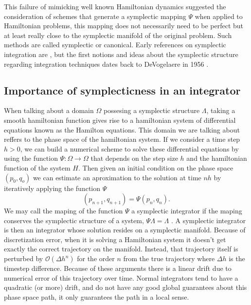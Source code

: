 This failure of mimicking well known Hamiltonian dynamics suggested the consideration of schemes that generate a symplectic mapping $\Psi$ when applied to Hamiltonian problems, this mapping does not necessarily need to be perfect but at least really close to the symplectic manifold of the original problem. Such methods are called symplectic or canonical. Early references on symplectic integration are \cite{ruth1983canonical}\cite{channell1983symplectic}\cite{menyuk1984some}\cite{feng2010symplectic}\cite{kang1991symplectic}, but the first notions and ideas about the symplectic structure regarding integration techniques dates back to DeVogelaere in 1956 \cite{channell1990symplectic}.



\subsection{Importance of symplecticness in an integrator}
When talking about a domain $\Omega$ possesing a symplectic structure $\Lambda$, taking a smooth hamiltonian function gives rise to a hamiltonian system of differential equations known as the Hamilton equations. This domain we are talking about reffers to the phase space of the hamiltonian system. If we consider a time step $h>0$, we can build a numerical scheme to solve these differential equations by using the function $\Psi :\Omega \rightarrow \Omega$ that depends on the step size $h$ and the hamiltonian function of the system $H$. Then given an initial condition on the phase space $(p_0,q_o)$ we can estimate an aproximation to the solution at time $nh$ by iteratively applying the function $\Psi$
\begin{equation}
(p_{n+1},q_{n+1})=\Psi(p_{n},q_{n}).
\end{equation}
We may call the maping of the function $\Psi$ a symplectic integrator if the maping conserves the symplectic structure of a system, $\Psi \Lambda=\Lambda$\cite{markiewicz1999survey}\cite{de1956methods}\cite{ruth1983canonical} \cite{channell1983symplectic}.
A symplectic integrator is then an integrator whose solution resides on a symplectic manifold. Because of discretization error, when it is solving a Hamiltonian system it doesn't get exactly the correct trajectory on the manifold. Instead, that trajectory itself is perturbed by $\mathcal{O}(\Delta h^n)$ for the order $n$ from the true trajectory where $\Delta h$ is the timestep difference. Because of these arguments there is a linear drift due to numerical error of this trajectory over time. Normal integrators tend to have a quadratic (or more) drift, and do not have any good global guarantees about this phase space path, it only guarantees the path in a local sense.\par




